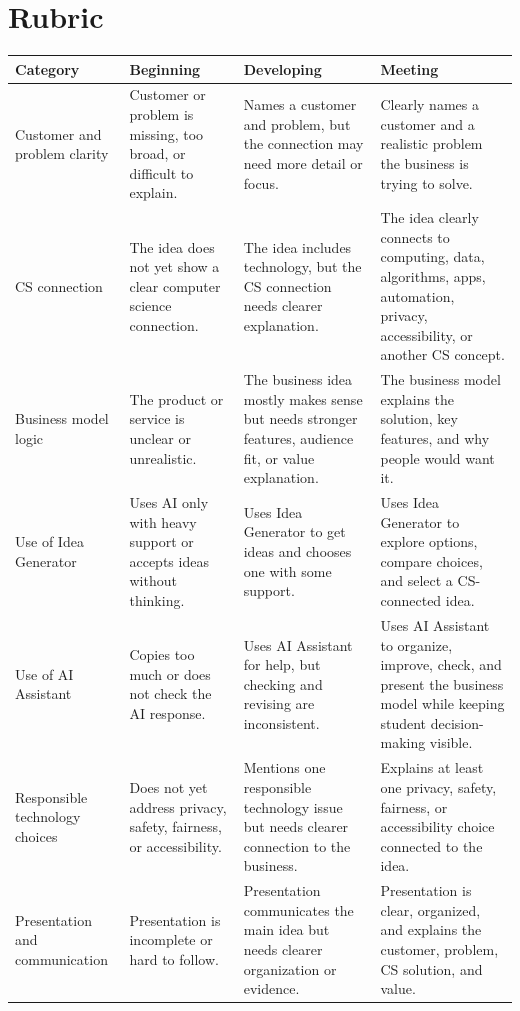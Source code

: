 \documentclass[11pt]{article}
\begin{document}
\section{Rubric}
\begin{longtable}{>{\raggedright\arraybackslash}p{}>{\raggedright\arraybackslash}p{}>{\raggedright\arraybackslash}p{}>{\raggedright\arraybackslash}p{}}
\textbf{Category} & \textbf{Beginning} & \textbf{Developing} & \textbf{Meeting} \\
\hline
Customer and problem clarity & Customer or problem is missing, too broad, or difficult to explain. & Names a customer and problem, but the connection may need more detail or focus. & Clearly names a customer and a realistic problem the business is trying to solve. \\
CS connection & The idea does not yet show a clear computer science connection. & The idea includes technology, but the CS connection needs clearer explanation. & The idea clearly connects to computing, data, algorithms, apps, automation, privacy, accessibility, or another CS concept. \\
Business model logic & The product or service is unclear or unrealistic. & The business idea mostly makes sense but needs stronger features, audience fit, or value explanation. & The business model explains the solution, key features, and why people would want it. \\
Use of Idea Generator & Uses AI only with heavy support or accepts ideas without thinking. & Uses Idea Generator to get ideas and chooses one with some support. & Uses Idea Generator to explore options, compare choices, and select a CS-connected idea. \\
Use of AI Assistant & Copies too much or does not check the AI response. & Uses AI Assistant for help, but checking and revising are inconsistent. & Uses AI Assistant to organize, improve, check, and present the business model while keeping student decision-making visible. \\
Responsible technology choices & Does not yet address privacy, safety, fairness, or accessibility. & Mentions one responsible technology issue but needs clearer connection to the business. & Explains at least one privacy, safety, fairness, or accessibility choice connected to the idea. \\
Presentation and communication & Presentation is incomplete or hard to follow. & Presentation communicates the main idea but needs clearer organization or evidence. & Presentation is clear, organized, and explains the customer, problem, CS solution, and value. \\
\end{longtable}
\end{document}
